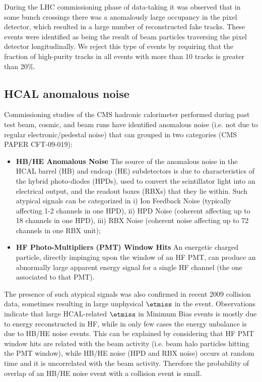 During the LHC commissioning phase of data-taking it was observed that
in some bunch crossings there was a anomalously large occupancy in the
pixel detector, which resulted in a large number of reconstructed fake
tracks. These events were identified as being the result of beam
particles traversing the pixel detector longitudinally. We reject this
type of events by requiring that the fraction of high-purity tracks in
all events with more than 10 tracks is greater than 20\%.

\subsection{HCAL anomalous noise}
Commissioning studies of the CMS hadronic calorimeter performed 
during past test beam, cosmic, and beam runs have 
identified anomalous noise (i.e. not due to regular 
electronic/pedestal noise) that can grouped in two categories 
(CMS PAPER CFT-09-019):
\begin{itemize}
\item{\bf HB/HE Anomalous Noise} The source of the anomalous noise in the HCAL 
barrel (HB) and endcap (HE) subdetectors is due to characteristics 
of the hybrid photo-diodes (HPDs), used to convert the scintillator light into 
an electrical output, and the readout boxes (RBXs) that they lie within.
Such atypical signals can be categorized 
in i) Ion Feedback Noise (typically affecting 1-2 channels in one HPD), ii) HPD Noise 
(coherent affecting up to 18 channels in one HPD), iii) RBX Noise 
(coherent noise affecting up to 72 channels in one RBX unit);
\item{\bf HF Photo-Multipliers (PMT) Window Hits} An energetic charged particle, directly 
impinging upon the window of an HF PMT, can produce an abnormally large apparent 
energy signal for a single HF channel (the one associated to that PMT). 
\end{itemize}

The presence of such atypical signals was also confirmed in recent 
2009 collision data, sometimes resulting in large unphysical $\etmiss$ in the event. 
Observations indicate that large HCAL-related $\etmiss$ 
in Minimum Bias events is mostly due to energy reconstructed in HF, 
while in only few cases the energy unbalance is due to HB/HE noise events. 
This can be explained by considering that HF PMT window hits 
are related with the beam activity (i.e. beam halo particles hitting the PMT window), 
while HB/HE noise (HPD and RBX noise) occurs at random time and it is 
uncorrelated with the beam activity. Therefore the probability of overlap 
of an HB/HE noise event with a collision event is small.

